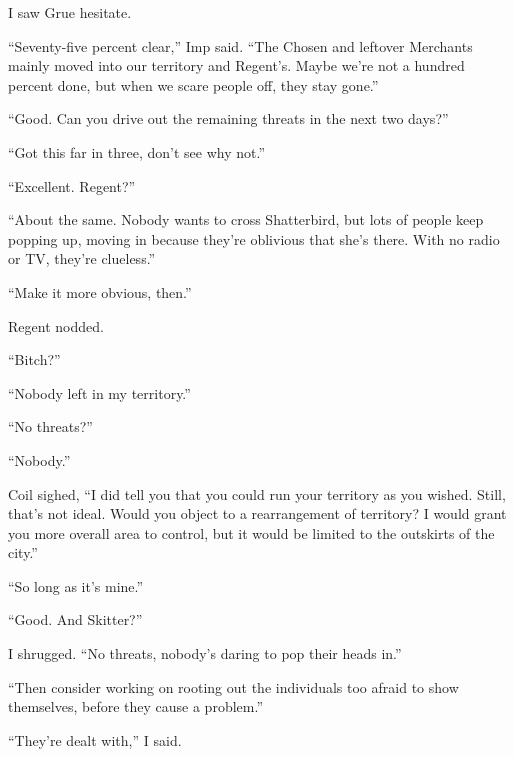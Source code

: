 I saw Grue hesitate.



``Seventy-five percent clear,'' Imp said.  ``The Chosen and leftover Merchants mainly moved into our territory and Regent's.  Maybe we're not a hundred percent done, but when we scare people off, they stay gone.''



``Good.  Can you drive out the remaining threats in the next two days?''



``Got this far in three, don't see why not.''



``Excellent.  Regent?''



``About the same.  Nobody wants to cross Shatterbird, but lots of people keep popping up, moving in because they're oblivious that she's there.  With no radio or TV, they're clueless.''



``Make it more obvious, then.''



Regent nodded.



``Bitch?''



``Nobody left in my territory.''



``No threats?''



``Nobody.''



Coil sighed, ``I did tell you that you could run your territory as you wished.  Still, that's not ideal.  Would you object to a rearrangement of territory?  I would grant you more overall area to control, but it would be limited to the outskirts of the city.''



``So long as it's mine.''



``Good.  And Skitter?''



I shrugged.  ``No threats, nobody's daring to pop their heads in.''



``Then consider working on rooting out the individuals too afraid to show themselves, before they cause a problem.''



``They're dealt with,'' I said.



